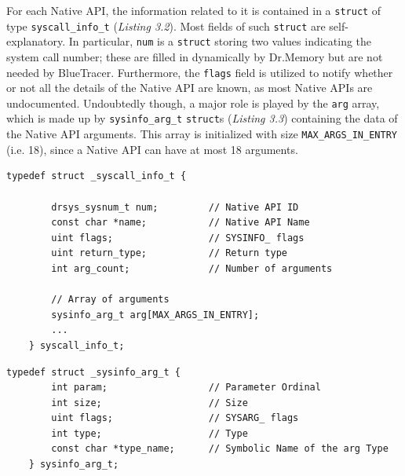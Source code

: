 For each Native API, the information related to it is contained in a \texttt{struct} of type \texttt{syscall\_info\_t} (\textit{Listing 3.2}). Most fields of such \texttt{struct} are self-explanatory. In particular, \texttt{num} is a \texttt{struct} storing two values indicating the system call number; these are filled in dynamically by Dr.Memory but are not needed by BlueTracer. Furthermore, the \texttt{flags} field is utilized to notify whether or not all the details of the Native API are known, as most Native APIs are undocumented. Undoubtedly though, a major role is played by the \texttt{arg} array, which is made up by \texttt{sysinfo\_arg\_t} \texttt{struct}s (\textit{Listing 3.3}) containing the data of the Native API arguments. This array is initialized with size \texttt{MAX\_ARGS\_IN\_ENTRY} (i.e. 18), since a Native API can have at most 18 arguments. 
\\
\begin{lstlisting}[caption={\texttt{struct} containing Native API-related information},captionpos=b]
	typedef struct _syscall_info_t {

		drsys_sysnum_t num;			// Native API ID
		const char *name;			// Native API Name
		uint flags; 				// SYSINFO_ flags
		uint return_type; 			// Return type
		int arg_count;				// Number of arguments

		// Array of arguments
		sysinfo_arg_t arg[MAX_ARGS_IN_ENTRY];
		...
	} syscall_info_t;
\end{lstlisting}

\begin{lstlisting}[caption={\texttt{struct} containing information associated to a Native API argument},captionpos=b]
	typedef struct _sysinfo_arg_t {
		int param; 				    // Parameter Ordinal
		int size; 				    // Size
		uint flags; 				// SYSARG_ flags
		int type; 				    // Type
		const char *type_name; 	    // Symbolic Name of the arg Type
	} sysinfo_arg_t;
\end{lstlisting}

